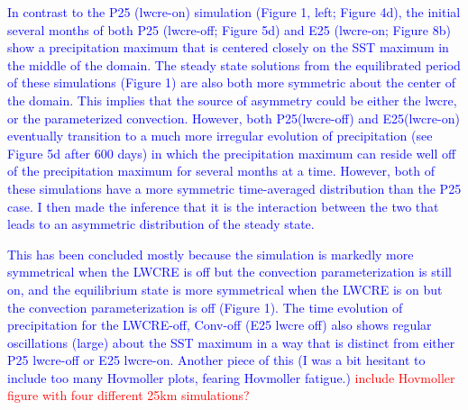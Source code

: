 \documentclass[draft]{agujournal2019}
\begin{document}
\begin{itemize}
  \textcolor{blue}{In contrast to the P25 (lwcre-on) simulation (Figure 1, left; Figure 4d), the initial several months of both P25 
  (lwcre-off; Figure 5d) and E25 (lwcre-on; Figure 8b) show a precipitation maximum that is centered closely on the SST 
  maximum in the middle of the domain.  The steady state solutions from the equilibrated period of these simulations (Figure 1) are 
  also both more symmetric about the center of the domain.  This implies that the source of asymmetry could be either the lwcre, 
  or the parameterized convection.  However, both P25(lwcre-off) and E25(lwcre-on) eventually transition to a much more irregular evolution of precipitation (see Figure 5d after 600 days) in which the precipitation maximum can reside well off of the 
  precipitation maximum for several months at a time.  However, both of these simulations have a more symmetric time-averaged distribution than the P25 case.  I then made the inference that it is the interaction between the two that leads to an asymmetric distribution of the steady state. }

\textcolor{blue}{
This has been concluded mostly because the simulation is markedly more symmetrical when the LWCRE is off but the convection parameterization is still on, and the equilibrium state is more symmetrical when the LWCRE is on but the convection parameterization is off (Figure 1).  The time evolution of precipitation for the LWCRE-off, Conv-off (E25 lwcre off) also shows regular oscillations (large) about the SST maximum in a way that is distinct from either P25 lwcre-off or E25 lwcre-on.  Another piece of this (I was a bit hesitant to include too many Hovmoller plots, fearing Hovmoller fatigue.)  }
\textcolor{red}{include Hovmoller figure with four different 25km simulations?}


\end{itemize}
\end{document}

